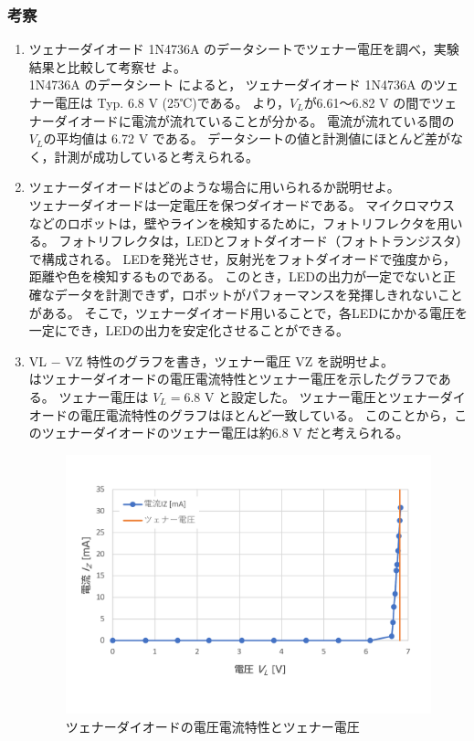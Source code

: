 \subsubsection{考察}
	\begin{enumerate}
		\item ツェナーダイオード 1N4736A のデータシートでツェナー電圧を調べ，実験結果と比較して考察せ
		よ。\\

		1N4736A のデータシート\cite{web:1N4736A} によると， ツェナーダイオード 1N4736A のツェナー電圧は Typ. 6.8 V (25℃)である。
		 より，$V_L$が6.61～6.82 V の間でツェナーダイオードに電流が流れていることが分かる。
		電流が流れている間の$V_L$の平均値は 6.72 V である。
		データシートの値と計測値にほとんど差がなく，計測が成功していると考えられる。

		\item ツェナーダイオードはどのような場合に用いられるか説明せよ。\\
  
		ツェナーダイオードは一定電圧を保つダイオードである。
		マイクロマウスなどのロボットは，壁やラインを検知するために，フォトリフレクタを用いる。
		フォトリフレクタは，LEDとフォトダイオード（フォトトランジスタ）で構成される。
		LEDを発光させ，反射光をフォトダイオードで強度から，距離や色を検知するものである。
		このとき，LEDの出力が一定でないと正確なデータを計測できず，ロボットがパフォーマンスを発揮しきれないことがある。
		そこで，ツェナーダイオード用いることで，各LEDにかかる電圧を一定にでき，LEDの出力を安定化させることができる。

  	\item VL − VZ 特性のグラフを書き，ツェナー電圧 VZ を説明せよ。\\
   
		 はツェナーダイオードの電圧電流特性とツェナー電圧を示したグラフである。
		ツェナー電圧は $V_L = $6.8 V と設定した。
		ツェナー電圧とツェナーダイオードの電圧電流特性のグラフはほとんど一致している。
		このことから，このツェナーダイオードのツェナー電圧は約6.8 V だと考えられる。
   
		\begin{figure}[!h]
			\centering
			\includegraphics[width=13cm]{./figs/G-zener_VL-IZ.pdf}
			\caption{ツェナーダイオードの電圧電流特性とツェナー電圧}
			\label{fig:zener_VL-IZ}
		\end{figure}


\end{enumerate}
